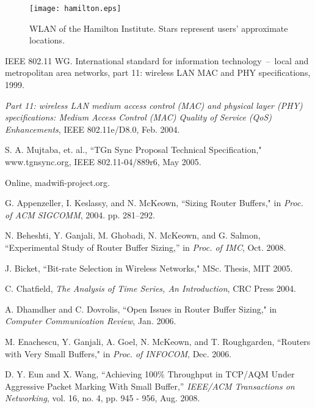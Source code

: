\documentclass[10pt,twocolumn, journal]{IEEEtran}
\begin{document}
\begin{figure}[b]
    \centering
    \texttt{[image: hamilton.eps]}
    \caption{WLAN of the Hamilton Institute. Stars represent users' approximate locations.}
    \label{fig_hi_topo}
\end{figure}




\begin{thebibliography}{}

IEEE 802.11 WG. International standard for information technology~--~local and
metropolitan area networks, part 11: wireless LAN MAC and PHY specifications, 1999.

\emph{Part 11: wireless LAN medium access control (MAC) and physical layer (PHY)
specifications: Medium Access Control (MAC) Quality of Service (QoS) Enhancements}, IEEE
802.11e/D8.0, Feb. 2004.

S. A. Mujtaba, et. al., ``TGn Sync Proposal Technical Specification," www.tgnsync.org,
IEEE 802.11-04/889r6, May 2005.

 Online, madwifi-project.org.

G. Appenzeller, I. Keslassy, and N. McKeown, ``Sizing Router Buffers," in \emph{Proc. of ACM SIGCOMM}, 2004. pp.
281--292.

N. Beheshti, Y. Ganjali, M. Ghobadi, N. McKeown, and G. Salmon, ``Experimental Study of Router Buffer Sizing,'' in \emph{Proc. of IMC}, Oct. 2008.


J. Bicket, ``Bit-rate Selection in Wireless Networks," MSc. Thesis, MIT 2005.

C. Chatfield, \emph{The Analysis of Time Series, An Introduction}, CRC Press 2004.

A. Dhamdher and C. Dovrolis, ``Open Issues in Router Buffer Sizing," in \emph{Computer
Communication Review}, Jan. 2006.


M. Enachescu, Y. Ganjali, A. Goel, N. McKeown, and T. Roughgarden, ``Routers with Very
Small Buffers," in \emph{Proc. of INFOCOM}, Dec. 2006.


D. Y. Eun and X. Wang, 	``Achieving 100\% Throughput in TCP/AQM Under Aggressive Packet Marking With Small Buffer,'' \emph{IEEE/ACM Transactions on Networking}, vol. 16, no. 4, pp. 945 - 956, Aug. 2008.



\end{thebibliography}
\end{document}
